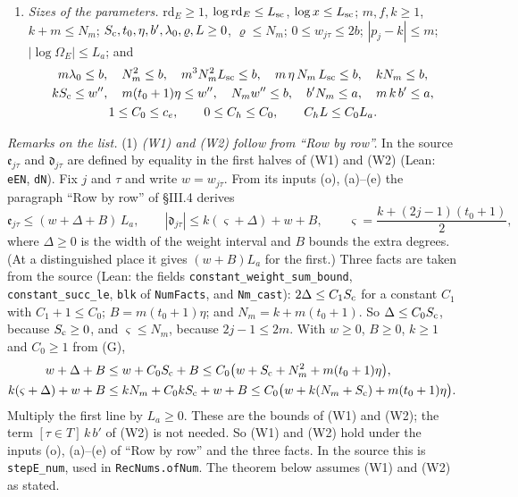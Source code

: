 \documentclass[11pt,letterpaper]{article}
\begin{document}
\begin{enumerate}[label=\textup{(G)},leftmargin=2.8em,itemsep=3pt,topsep=3pt]
\item \emph{Sizes of the parameters.} $\mathrm{rd}_E\ge1$, $\log\mathrm{rd}_E\le L_{\rm sc}$,
$\log x\le L_{\rm sc}$; $m,f,k\ge1$, $k+m\le N_m$; $S_{\rm c},t_0,\eta,b',\lambda_0,\varrho,L\ge0$,
$\varrho\le N_m$; $0\le w_{j\tau}\le2b$; $|p_j-k|\le m$; $|\log\Omega_E|\le L_a$; and
\begin{gather}\label{D:260}
 m\lambda_0\le b,\quad N_m^2\le b,\quad m^3N_m^2L_{\rm sc}\le b,\quad m\,\eta\,N_m\,L_{\rm sc}\le b,\quad
 kN_m\le b,\\
 kS_{\rm c}\le w'',\quad m(t_0+1)\eta\le w'',\quad N_mw''\le b,\quad b'N_m\le a,\quad m\,k\,b'\le a,\\
 1\le C_0\le c_e,\qquad 0\le C_h\le C_0,\qquad C_hL\le C_0L_a .
\end{gather}
\end{enumerate}

\emph{Remarks on the list.} (1) \emph{\textup{(W1)} and \textup{(W2)} follow from ``Row by row''.} In
the source $\mathfrak e_{j\tau}$ and $\mathfrak d_{j\tau}$ are defined by equality in the first halves of
(W1) and (W2) (Lean: \texttt{eEN}, \texttt{dN}). Fix $j$ and $\tau$ and write $w=w_{j\tau}$. From its
inputs (o), (a)--(e) the paragraph ``Row by row'' of \S III.4 derives
\begin{equation}\label{D:261}
 \mathfrak e_{j\tau}\le(w+\Delta+B)\,L_a,\qquad|\mathfrak d_{j\tau}|\le k(\varsigma+\Delta)+w+B,
 \qquad\varsigma=\frac{k+(2j-1)(t_0+1)}2 ,
\end{equation}
where $\Delta\ge0$ is the width of the weight interval and $B$ bounds the extra degrees. (At a
distinguished place it gives $(w+B)L_a$ for the first.) Three facts are taken from the source (Lean:
the fields \texttt{constant\_weight\_sum\_bound}, \texttt{constant\_succ\_le}, \texttt{blk} of
\texttt{NumFacts}, and \texttt{Nm\_cast}): $2\Delta\le C_1S_{\rm c}$ for a constant $C_1$ with
$C_1+1\le C_0$; $B=m(t_0+1)\eta$; and $N_m=k+m(t_0+1)$. So $\Delta\le C_0S_{\rm c}$, because
$S_{\rm c}\ge0$, and $\varsigma\le N_m$, because $2j-1\le2m$. With $w\ge0$, $B\ge0$, $k\ge1$ and
$C_0\ge1$ from (G),
\begin{align}\label{D:262}
 w+\Delta+B&\le w+C_0S_{\rm c}+B\le C_0\big(w+S_{\rm c}+N_m^2+m(t_0+1)\eta\big),\\
 k(\varsigma+\Delta)+w+B&\le kN_m+C_0kS_{\rm c}+w+B\le C_0\big(w+k(N_m+S_{\rm c})+m(t_0+1)\eta\big).
\end{align}
Multiply the first line by $L_a\ge0$. These are the bounds of (W1) and (W2); the term
$[\tau\in T]\,k\,b'$ of (W2) is not needed. So (W1) and (W2) hold under the inputs (o), (a)--(e) of
``Row by row'' and the three facts. In the source this is \texttt{stepE\_num}, used in
\texttt{RecNums.ofNum}. The theorem below assumes (W1) and (W2) as stated.
\end{document}
